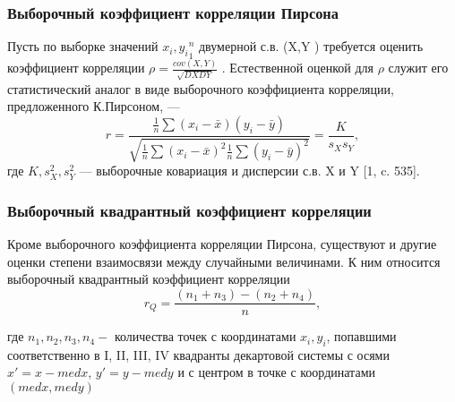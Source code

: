 \subsubsection{Выборочный коэффициент корреляции Пирсона}
Пусть по выборке значений ${x_{i},y_{i}}^{n}_{1}$ двумерной с.в. (X,Y ) требуется оценить коэффициент корреляции $\rho = \frac{cov(X,Y)}{\sqrt{DXDY}}$ . Естественной оценкой для $\rho$ служит его статистический аналог в виде выборочного коэффициента корреляции, предложенного К.Пирсоном, —
\begin{equation}
r = \frac{
	\frac{1}{n}\sum{(x_{i} - \bar{x})(y_{i}-\bar{y})}
}{
	\sqrt{\frac{1}{n}\sum{(x_{i} - \bar{x})^{2}}\frac{1}{n}\sum{(y_{i} - \bar{y})^{2}}}
}=\frac{K}{s_{X}s_{Y}},
\label{r}
\end{equation}
где $K,s^{2}_{X},s^{2}_{Y}$ — выборочные ковариация и дисперсии с.в. X и Y [1, c. 535].


\subsubsection{Выборочный квадрантный коэффициент корреляции}
Кроме выборочного коэффициента корреляции Пирсона, существуют и другие оценки степени взаимосвязи между случайными величинами. К ним относится выборочный квадрантный коэффициент корреляции
\begin{equation}
r_{Q} = \frac{(n_{1} + n_{3}) - (n_{2} + n_{4})}{n},
\label{rQ}
\end{equation}

где $n_1, n_2, n_3, n_4 - $ количества точек с координатами $x_i, y_i$, попавшими соответственно в I, II, III, IV квадранты декартовой системы с осями $x'=x-med x$, $y'=y-med y$ и с центром в точке с координатами $(med x, med y)$



